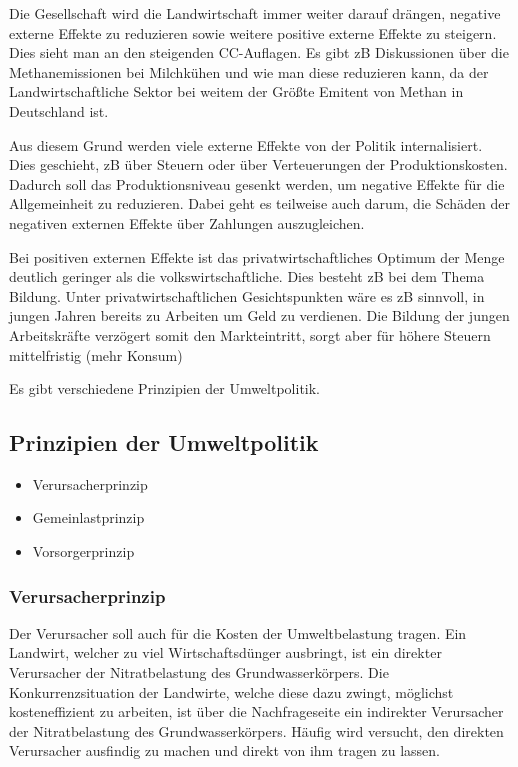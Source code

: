 \documentclass[11pt]{scrbook}
\begin{document}
Die Gesellschaft wird die Landwirtschaft immer weiter darauf drängen, negative externe Effekte zu reduzieren sowie weitere positive externe Effekte zu steigern.
Dies sieht man an den steigenden \ac{CC}-Auflagen.
Es gibt zB Diskussionen über die Methanemissionen bei Milchkühen und wie man diese reduzieren kann, da der Landwirtschaftliche Sektor bei weitem der Größte Emitent von Methan in Deutschland ist.

Aus diesem Grund werden viele externe Effekte von der Politik internalisiert.
Dies geschieht, zB über Steuern oder über Verteuerungen der Produktionskosten.
Dadurch soll das Produktionsniveau gesenkt werden, um negative Effekte für die Allgemeinheit zu reduzieren.
Dabei geht es teilweise auch darum, die Schäden der negativen externen Effekte über Zahlungen auszugleichen.

Bei positiven externen Effekte ist das privatwirtschaftliches Optimum der Menge deutlich geringer als die volkswirtschaftliche.
Dies besteht zB bei dem Thema Bildung.
Unter privatwirtschaftlichen Gesichtspunkten wäre es zB sinnvoll, in jungen Jahren bereits zu Arbeiten um Geld zu verdienen.
Die Bildung der jungen Arbeitskräfte verzögert somit den Markteintritt, sorgt aber für höhere Steuern mittelfristig (mehr Konsum)

Es gibt verschiedene Prinzipien der Umweltpolitik.

\subsection{Prinzipien der Umweltpolitik}
\begin{itemize}
	\item Verursacherprinzip
	\item Gemeinlastprinzip
	\item Vorsorgerprinzip
\end{itemize}

\subsubsection{Verursacherprinzip}
Der Verursacher soll auch für die Kosten der Umweltbelastung tragen.
Ein Landwirt, welcher zu viel Wirtschaftsdünger ausbringt, ist ein direkter Verursacher der Nitratbelastung des Grundwasserkörpers.
Die Konkurrenzsituation der Landwirte, welche diese dazu zwingt, möglichst kosteneffizient zu arbeiten, ist über die Nachfrageseite ein indirekter Verursacher der Nitratbelastung des Grundwasserkörpers.
Häufig wird versucht, den direkten Verursacher ausfindig zu machen und direkt von ihm tragen zu lassen.
\end{document}
